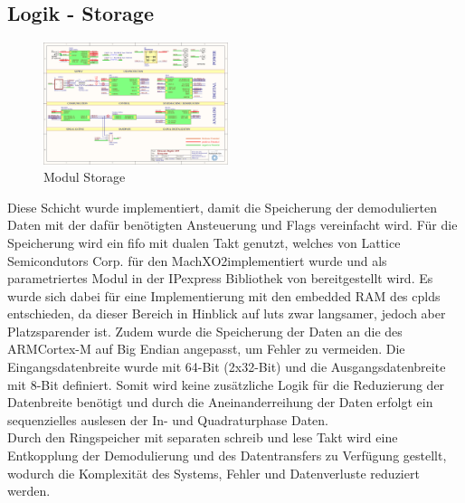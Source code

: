 \subsection{Logik - Storage}
\begin{figure}[h!]
	\centering
	\includegraphics[page=11,width=0.48\textwidth, trim=111mm 89mm 127mm 81mm, clip=true]{images/pcb/new.PDF}%
	\caption{Modul Storage}
	\label{fig:layer_fifo}
\end{figure}
Diese Schicht wurde implementiert, damit die Speicherung der demodulierten Daten mit der dafür benötigten Ansteuerung und Flags vereinfacht wird. Für die Speicherung wird ein \ac{fifo} mit dualen Takt genutzt, welches von Lattice Semicondutors Corp. für den MachXO2\SymbTM implementiert wurde und als parametriertes Modul in der IPexpress Bibliothek von \SymbTM bereitgestellt wird. Es wurde sich dabei für eine Implementierung mit den embedded RAM des \ac{cpld}s entschieden, da dieser Bereich in Hinblick auf \ac{lut}s zwar langsamer, jedoch aber Platzsparender ist. Zudem wurde die Speicherung der Daten an die des ARM\SymbReg Cortex\SymbReg-M auf Big Endian angepasst, um Fehler zu vermeiden. Die Eingangsdatenbreite wurde mit 64-Bit (2x32-Bit) und die Ausgangsdatenbreite mit 8-Bit definiert. Somit wird keine zusätzliche Logik für die Reduzierung der Datenbreite benötigt und durch die Aneinanderreihung der Daten erfolgt ein sequenzielles auslesen der In- und Quadraturphase Daten.\\
Durch den Ringspeicher mit separaten schreib und lese Takt wird eine Entkopplung der Demodulierung und des Datentransfers zu Verfügung gestellt, wodurch die Komplexität des Systems, Fehler und Datenverluste reduziert werden.
